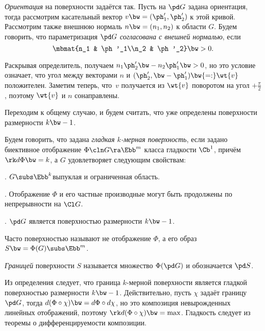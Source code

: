 \documentclass[a4paper]{article}
\begin{document}
\emph{Ориентация} на поверхности задаётся так. Пусть на $\pd G$ задана ориентация, тогда
рассмотрим касательный вектор $v \bw= (\ph'_1, \ph'_2)$ к этой кривой. Рассмотрим также
внешнюю нормаль $n \bw= (n_1, n_2)$ к области $G$. Будем говорить,
что параметризация $\pd G$ \emph{согласована с внешней нормалью}, если
\vskip-10pt
$$\mbmat{n_1 & \ph'_1\\n_2 & \ph'_2} \bw> 0.$$

\hangindent=-30mm
\noindent
Раскрывая определитель, получаем
$n_1\ph'_2 \bw- n_2\ph'_1 \bw> 0$, но это условие означает, что угол между векторами
$n$ и $(\ph'_2, \bw-\ph'_1) \bw{=:} \wt{v}$ положителен. Заметим теперь, что~$v$
получается из $\wt{v}$ поворотом на угол $+\frac\pi2$, поэтому $\wt{v}$ и $n$ сонаправлены.

Переходим к общему случаю, и будем считать, что уже определены поверхности размерности $k\bw-1$.

\begin{df}
Будем говорить, что задана \emph{гладкая $k$-мерная поверхность}, если задано биективное
отображение $\Phi\cln G \ra \Ebb^m$ класса гладкости $\Cb^1$, причём $\rk d\Phi \bw= k$, а
$G$ удовлетворяет следующим свойствам:

. $G \subs \Ebb^k$\т выпуклая и ограниченная область.

. Отображение $\Phi$ и его частные производные могут быть продолжены по непрерывности на $\Cl G$.

. $\pd G$ является поверхностью размерности $k\bw-1$.

\end{df}

\begin{note}
Часто поверхностью называют не отображение $\Phi$, а его образ $S \bw= \Phi(G) \subs \Ebb^m$.
\end{note}

\begin{df}
\emph{Границей} поверхности $S$ называется множество $\Phi(\pd G)$ и обозначается $\pd S$.
\end{df}

Из определения следует, что граница $k$-мерной поверхности является гладкой поверхностью размерности $k\bw-1$.
Действительно, пусть $\chi$ задаёт границу $\pd G$, тогда $d(\Phi\circ\chi) \bw= d\Phi\circ d\chi$,
но это композиция невырожденных линейных отображений, поэтому $\rk d(\Phi\circ\chi) \bw= \max$.
Гладкость следует из теоремы о дифференцируемости композиции.
\end{document}
